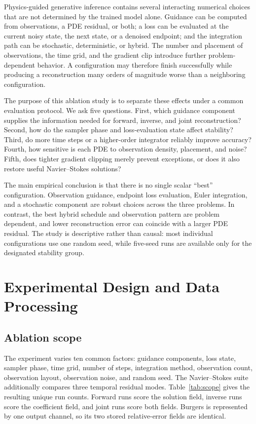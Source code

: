 \documentclass[twoside,11pt]{article}
\begin{document}
Physics-guided generative inference contains several interacting numerical
choices that are not determined by the trained model alone.  Guidance can
be computed from observations, a PDE residual, or both; a loss can be
evaluated at the current noisy state, the next state, or a denoised endpoint;
and the integration path can be stochastic, deterministic, or hybrid.  The
number and placement of observations, the time grid, and the gradient clip
introduce further problem-dependent behavior.  A configuration may therefore
finish successfully while producing a reconstruction many orders of
magnitude worse than a neighboring configuration.

The purpose of this ablation study is to separate these effects under a
common evaluation protocol.  We ask five questions.  First, which guidance
component supplies the information needed for forward, inverse, and joint
reconstruction?  Second, how do the sampler phase and loss-evaluation state
affect stability?  Third, do more time steps or a higher-order integrator
reliably improve accuracy?  Fourth, how sensitive is each PDE to observation
density, placement, and noise?  Fifth, does tighter gradient clipping merely
prevent exceptions, or does it also restore useful Navier--Stokes solutions?

The main empirical conclusion is that there is no single scalar ``best''
configuration.  Observation guidance, endpoint loss evaluation, Euler
integration, and a stochastic component are robust choices across the three
problems.  In contrast, the best hybrid schedule and observation pattern are
problem dependent, and lower reconstruction error can coincide with a larger
PDE residual.  The study is descriptive rather than causal: most individual
configurations use one random seed, while five-seed runs are available only
for the designated stability group.

\section{Experimental Design and Data Processing}
\label{sec:design}

\subsection{Ablation scope}

The experiment varies ten common factors: guidance components, loss state,
sampler phase, time grid, number of steps, integration method, observation
count, observation layout, observation noise, and random seed.  The
Navier--Stokes suite additionally compares three temporal residual modes.
Table~\ref{tab:scope} gives the resulting unique run counts.  Forward runs
score the solution field, inverse runs score the coefficient field, and joint
runs score both fields.  Burgers is represented by one output channel, so its
two stored relative-error fields are identical.
\end{document}
